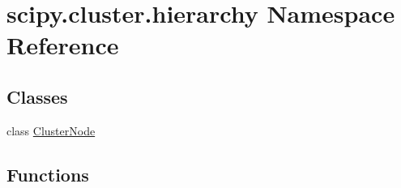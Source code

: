 \hypertarget{namespacescipy_1_1cluster_1_1hierarchy}{}\section{scipy.\+cluster.\+hierarchy Namespace Reference}
\label{namespacescipy_1_1cluster_1_1hierarchy}
\subsection*{Classes}
\begin{DoxyCompactItemize}
\item 
class \hyperlink{classscipy_1_1cluster_1_1hierarchy_1_1ClusterNode}{Cluster\+Node}
\end{DoxyCompactItemize}
\subsection*{Functions}
